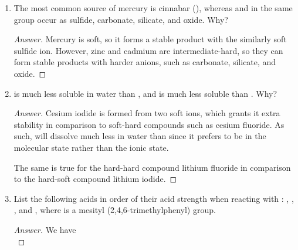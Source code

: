 \documentclass[../psets.tex]{subfiles}
\begin{document}
\begin{enumerate}[label={\Roman*)}]
\begin{enumerate}[label={\textbf{6.\arabic*}}]
\begin{enumerate}[label={\textbf{\alph*.}}]
\begin{proof}[Answer]
            \end{proof}
            \item Propose a structure of the product (see \cite{bib:pset4-613}).
            \begin{proof}[Answer]
                ${\color{white}hi}$
                \begin{center}
                \end{center}
            \end{proof}
        \end{enumerate}
        \newpage
        \setcounter{enumii}{24}
        \item The most common source of mercury is cinnabar (), whereas  and  in the same group occur as sulfide, carbonate, silicate, and oxide. Why?
        \begin{proof}[Answer]
            Mercury is soft, so it forms a stable product with the similarly soft sulfide ion. However, zinc and cadmium are intermediate-hard, so they can form stable products with harder anions, such as carbonate, silicate, and oxide.
        \end{proof}
        \newpage
        \setcounter{enumii}{29}
        \item {} is much less soluble in water than , and  is much less soluble than . Why?
        \begin{proof}[Answer]
            Cesium iodide is formed from two soft ions, which grants it extra stability in comparison to soft-hard compounds such as cesium fluoride. As such,  will dissolve much less in water than  since it prefers to be in the molecular state rather than the ionic state.\par
            The same is true for the hard-hard compound lithium fluoride in comparison to the hard-soft compound lithium iodide.
        \end{proof}
        \newpage
        \setcounter{enumii}{36}
        \item List the following acids in order of their acid strength when reacting with : , , , and , where  is a mesityl (2,4,6-trimethylphenyl) group.
        \begin{proof}[Answer]
            We have
            \begin{equation*}

\end{equation*}
\end{proof}
\end{enumerate}
\end{enumerate}
\end{document}
